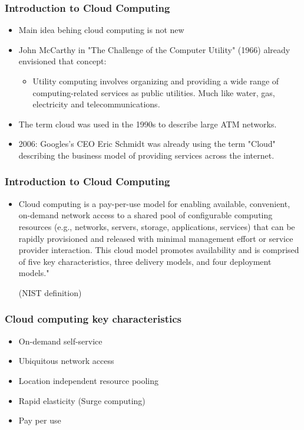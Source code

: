 \documentclass{beamer}
\begin{document}
\begin{frame}
\frametitle{Introduction to Cloud Computing}
\begin{itemize}
  \item Main idea behing cloud computing is not new
  \item John McCarthy in "The Challenge of the Computer Utility" (1966) already envisioned that concept:
    \begin{itemize}
    \item \begin{em} Utility computing involves organizing and providing a wide range of computing-related services as public utilities. Much like water, gas, electricity and telecommunications. \end {em}
    \end{itemize}
  \item The term cloud was used in the 1990s to describe large ATM networks.
  \item 2006: Googles's CEO Eric Schmidt was already using the term "Cloud" describing the business model of providing services across the internet.
\end{itemize}
\end{frame}



\begin{frame}
\frametitle{Introduction to Cloud Computing}
\begin{itemize}
  \item \begin{em} Cloud computing is a pay-per-use model for enabling available, convenient, on-demand network access to a shared pool of configurable computing resources (e.g., networks, servers, storage, applications, services) that can be rapidly provisioned and released with minimal management effort or service provider interaction. This cloud model promotes availability and is comprised of five key characteristics, three delivery models, and four deployment models." \end{em} (NIST definition)
\end{itemize}
\end{frame}


\begin{frame}
\frametitle{Cloud computing key characteristics}
\begin{itemize}
  \item On-demand self-service 
  \item Ubiquitous network access
  \item Location independent resource pooling
  \item Rapid elasticity (Surge computing)
  \item Pay per use
\end{itemize}
\end{frame}
\end{document}
